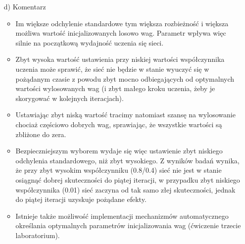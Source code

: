 \documentclass[17pt]{article}
\begin{document}
\begin{enumerate}
\item[d)] Komentarz

\begin{itemize}
\item Im większe odchylenie standardowe tym większa rozbieżność i większa możliwa wartość inicjalizowanych losowo wag. Parametr wpływa więc silnie na początkową wydajność uczenia się sieci.
\item Zbyt wysoka wartość ustawienia przy niskiej wartości współczynnika uczenia może sprawić, że sieć nie będzie w stanie wyuczyć się w pożądanym czasie z powodu zbyt mocno odbiegających od optymalnych wartości wylosowanych wag (i zbyt małego kroku uczenia, żeby je skorygować w kolejnych iteracjach).
\item Ustawiając zbyt niską wartość tracimy natomiast szansę na wylosowanie chociaż częściowo dobrych wag, sprawiając, że wszystkie wartości są zbliżone do zera.
\item Bezpieczniejszym wyborem wydaje się więc ustawienie zbyt niskiego odchylenia standardowego, niż zbyt wysokiego. Z wyników badań wynika, że przy zbyt wysokim współczynniku (0.8/0.4) sieć nie jest w stanie osiągnąć dobrej skuteczności do piątej iteracji, w przypadku zbyt niskiego współczynnika (0.01) sieć zaczyna od tak samo złej skuteczności, jednak do piątej iteracji uzyskuje pożądane efekty.
\item Istnieje także możliwość implementacji mechanizmów automatycznego określania optymalnych parametrów inicjalizowania wag (ćwiczenie trzecie laboratorium).
\end{itemize}

\end{enumerate}
\newpage
\end{document}
